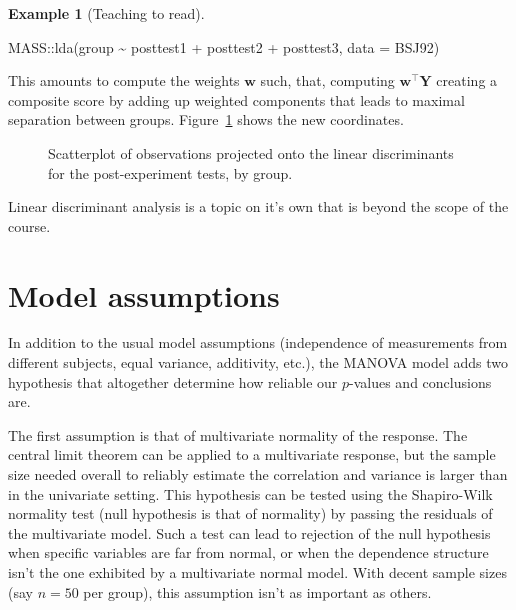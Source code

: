\documentclass[
  11pt,
  letterpaper,
]{scrbook}
\newenvironment{Shaded}{\begin{snugshade}}{\end{snugshade}}
\newcommand{\AttributeTok}[1]{\textcolor[rgb]{0.40,0.45,0.13}{#1}}
\newcommand{\FunctionTok}[1]{\textcolor[rgb]{0.28,0.35,0.67}{#1}}
\newcommand{\NormalTok}[1]{\textcolor[rgb]{0.00,0.23,0.31}{#1}}
\newcommand{\SpecialCharTok}[1]{\textcolor[rgb]{0.37,0.37,0.37}{#1}}
\theoremstyle{definition}
\theoremstyle{definition}
\newtheorem{example}{Example}[chapter]
\theoremstyle{remark}
\begin{document}
\begin{example}[Teaching to
read]
\begin{Shaded}
\begin{Highlighting}[]
\NormalTok{MASS}\SpecialCharTok{::}\FunctionTok{lda}\NormalTok{(group }\SpecialCharTok{\textasciitilde{}}\NormalTok{ posttest1 }\SpecialCharTok{+}\NormalTok{ posttest2 }\SpecialCharTok{+}\NormalTok{ posttest3,}
          \AttributeTok{data =}\NormalTok{ BSJ92)}
\end{Highlighting}
\end{Shaded}

This amounts to compute the weights \(\boldsymbol{w}\) such, that,
computing \(\boldsymbol{w}^\top\boldsymbol{Y}\) creating a composite
score by adding up weighted components that leads to maximal separation
between groups. Figure~\ref{fig-lindiscrim} shows the new coordinates.

\begin{figure}[ht!]


\caption{\label{fig-lindiscrim}Scatterplot of observations projected
onto the linear discriminants for the post-experiment tests, by group.}

\end{figure}%

Linear discriminant analysis is a topic on it's own that is beyond the
scope of the course.

\end{example}

\section{Model assumptions}\label{model-assumptions-1}

In addition to the usual model assumptions (independence of measurements
from different subjects, equal variance, additivity, etc.), the MANOVA
model adds two hypothesis that altogether determine how reliable our
\(p\)-values and conclusions are.

The first assumption is that of multivariate normality of the response.
The central limit theorem can be applied to a multivariate response, but
the sample size needed overall to reliably estimate the correlation and
variance is larger than in the univariate setting. This hypothesis can
be tested using the Shapiro-Wilk normality test (null hypothesis is that
of normality) by passing the residuals of the multivariate model. Such a
test can lead to rejection of the null hypothesis when specific
variables are far from normal, or when the dependence structure isn't
the one exhibited by a multivariate normal model. With decent sample
sizes (say \(n=50\) per group), this assumption isn't as important as
others.
\end{document}
